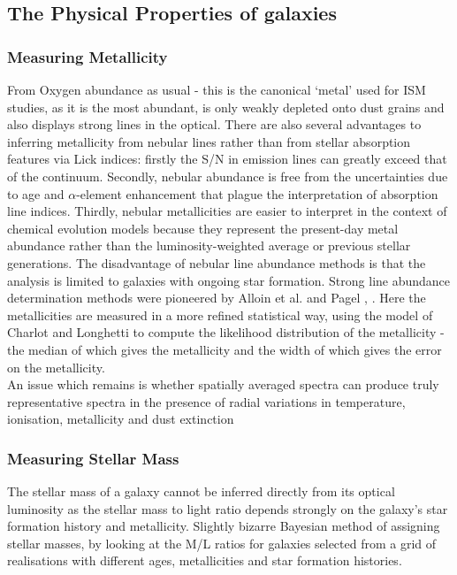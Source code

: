 \documentclass{literature}
\begin{document}
\subsection{The Physical Properties of galaxies}
\subsubsection{Measuring Metallicity}
From Oxygen abundance as usual - this is the canonical `metal' used for ISM studies, as it is the most abundant, is only weakly depleted onto dust grains and also displays strong lines in the optical. There are also several advantages to inferring metallicity from nebular lines rather than from stellar absorption features via Lick indices: firstly the S/N in emission lines can greatly exceed that of the continuum. Secondly, nebular abundance is free from the uncertainties due to age and $\alpha$-element enhancement that plague the interpretation of absorption line indices. Thirdly, nebular metallicities are easier to interpret in the context of chemical evolution models because they represent the present-day metal abundance rather than the luminosity-weighted average or previous stellar generations. The disadvantage of nebular line abundance methods is that the analysis is limited to galaxies with ongoing star formation. Strong line abundance determination methods were pioneered by Alloin et al. and Pagel \citep{Alloin1979}, \citep{Pagel1979}. Here the metallicities are measured in a more refined statistical way, using the model of Charlot and Longhetti \citep{Charlot2001} to compute the likelihood distribution of the metallicity - the median of which gives the metallicity and the width of which gives the error on the metallicity. \\ 
An issue which remains is whether spatially averaged spectra can produce truly representative spectra in the presence of radial variations in temperature, ionisation, metallicity and dust extinction \citep{Kobulnicky1999}
\subsubsection{Measuring Stellar Mass}
The stellar mass of a galaxy cannot be inferred directly from its optical luminosity as the stellar mass to light ratio depends strongly on the galaxy's star formation history and metallicity. Slightly bizarre Bayesian method of assigning stellar masses, by looking at the M/L ratios for galaxies selected from a grid of realisations with different ages, metallicities and star formation histories. \\ 
\end{document}
